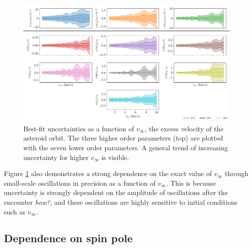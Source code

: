 \documentclass{aastex631}
\newcommand{\jtd}[1]{{\color{red}\textit{#1}}}
\begin{document}
\begin{figure}
  \centering
  \includegraphics[width=\textwidth]{scan-vex.pdf}
  \caption{Best-fit uncertainties as a function of $v_\infty$, the excess velocity of the asteroid orbit. The three higher order parameters (top) are plotted with the seven lower order parameters. A general trend of increasing uncertainty for higher $v_\infty$ is visible.}
  \label{fig:scan-vex}
\end{figure}

Figure \ref{fig:scan-vex} also demonstrates a strong dependence on the exact value of $v_\infty$ through small-scale oscillations in precision as a function of $v_\infty$. This is because uncertainty is strongly dependent on the amplitude of oscillations after the encounter \jtd{how?}, and these oscillations are highly sensitive to initial conditions such as $v_\infty$.


\subsection{Dependence on spin pole}
\end{document}
